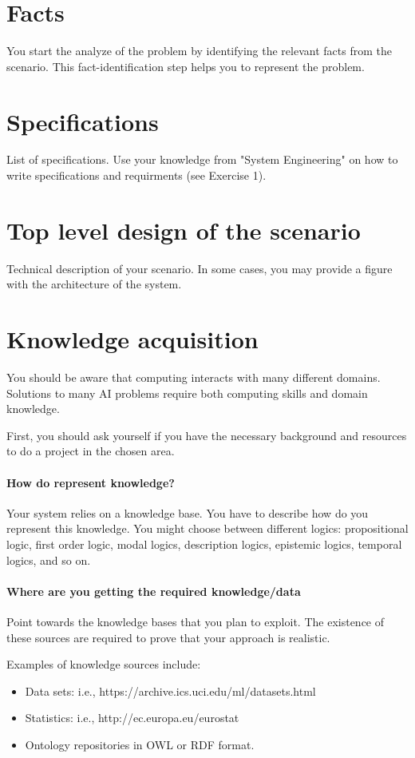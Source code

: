 \documentclass[a4paper,12pt]{report}
\begin{document}
\section{Facts}
You start the analyze of the problem by identifying 
the relevant facts from the scenario.
This fact-identification step helps you to represent the problem.


\section{Specifications}
List of specifications. 
Use your knowledge from "System Engineering" on how to write specifications and requirments (see Exercise 1).

\section{Top level design of the scenario}
Technical description of your scenario. 
In some cases, you may provide a figure with the architecture of the system. 


\section{Knowledge acquisition}
You should be aware that computing interacts with many different domains. 
Solutions to many AI problems require both computing skills and domain knowledge.

First, you should ask yourself if you have the necessary background and resources to do
a project in the chosen area. 

\paragraph{How do represent knowledge?} 
Your system relies on a knowledge base.
You have to describe how do you represent this knowledge.
You might choose between different logics: 
propositional logic, first order logic, modal logics, description logics, epistemic logics, 
temporal logics, and so on. 

\paragraph{Where are you getting the required knowledge/data}
Point towards the knowledge bases that you plan to exploit. 
The existence of these sources are required to prove that your approach is realistic.

Examples of knowledge sources include:
\begin{itemize}
\item Data sets: i.e., https://archive.ics.uci.edu/ml/datasets.html 
\item Statistics: i.e., http://ec.europa.eu/eurostat 
\item Ontology repositories in OWL or RDF format.
\end{itemize}
\end{document}
